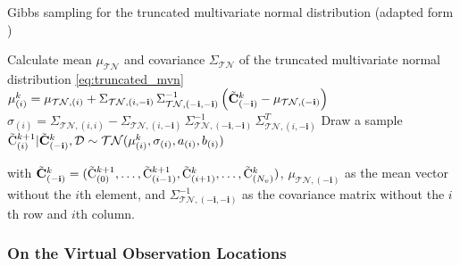 \begin{algorithm}[h]
\centering
\caption{Gibbs sampling for the truncated multivariate normal distribution (adapted form \textcite[Section~3.1.2]{Wang_2016})}
\begin{algorithmic}[1]
\Require Calculate mean $\mu_{\mathcal{TN}}$ and covariance $\Sigma_{\mathcal{TN}}$ of the truncated multivariate normal distribution \eqref{eq:truncated_mvn}
\State $\mu^k_{(i)} = \mu_{\mathcal{TN},(i)} + \Sigma_{\mathcal{TN},(i, \mathbf{-i})} \,  \Sigma^{-1}_{\mathcal{TN}, (\mathbf{-i}, \mathbf{-i})} \left( \tilde{\mathrm{\mathbf{C}}}^k_{(\mathbf{-i})} - \mu_{\mathcal{TN},(\mathbf{-i})}\right)$
\State $\sigma_{(i)} = \Sigma_{\mathcal{TN},(i, i)} - \Sigma_{\mathcal{TN},(i, \mathbf{-i})} \,\Sigma^{-1}_{\mathcal{TN}, (\mathbf{-i}, \mathbf{-i})} \,\Sigma^T_{\mathcal{TN},(i, \mathbf{-i})}$
\State Draw a sample $\tilde{\mathrm{C}}^{k+1}_{(i)}|\tilde{\mathrm{\mathbf{C}}}^k_{(\mathbf{-i})}, \mathcal{D} \sim \mathcal{TN}(\mu^k_{(i)}, \sigma_{(i)}, a_{(i)}, b_{(i)})$
\EndFor
\EndFor

\noindent with $\tilde{\mathrm{\mathbf{C}}}^k_{(\mathbf{-i})} = (\tilde{\mathrm{C}}^{k+1}_{(0)},\dots, \tilde{\mathrm{C}}^{k+1}_{(i-1)}, \tilde{\mathrm{C}}^{k}_{(i+1)},\dots,\tilde{\mathrm{C}}^{k}_{(N_v)})$, $\mu_{\mathcal{TN},(\mathbf{-i})}$ as the mean vector without the $i$th element, and $\Sigma^{-1}_{\mathcal{TN}, (\mathbf{-i}, \mathbf{-i})}$ as the covariance matrix without the $i$th row and $i$th column.
\end{algorithmic}
\label{algo:gibbssampling}
\end{algorithm}

\subsubsection{On the Virtual Observation Locations}

